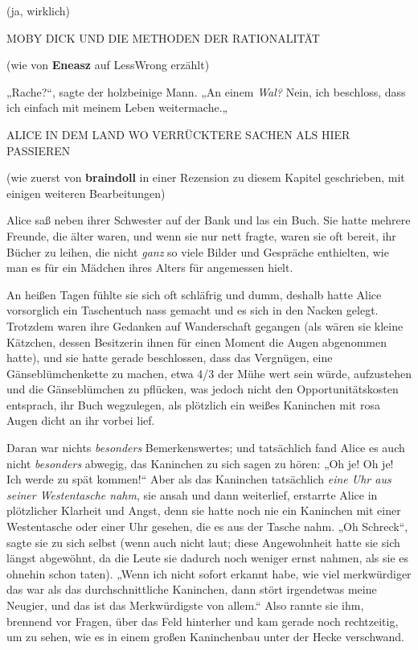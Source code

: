 {(ja, wirklich)

MOBY DICK UND DIE METHODEN DER RATIONALITÄT

(wie von \textbf{Eneasz} auf LessWrong erzählt)

„Rache?“, sagte der holzbeinige Mann. „An einem \emph{Wal?} Nein, ich beschloss, dass ich einfach mit meinem Leben weitermache.„

ALICE IN DEM LAND WO VERRÜCKTERE SACHEN ALS HIER PASSIEREN

(wie zuerst von \textbf{braindoll} in einer Rezension zu diesem Kapitel geschrieben, mit einigen weiteren Bearbeitungen)

Alice saß neben ihrer Schwester auf der Bank und las ein Buch. Sie hatte mehrere Freunde, die älter waren, und wenn sie nur nett fragte, waren sie oft bereit, ihr Bücher zu leihen, die nicht \emph{ganz} so viele Bilder und Gespräche enthielten, wie man es für ein Mädchen ihres Alters für angemessen hielt.

An heißen Tagen fühlte sie sich oft schläfrig und dumm, deshalb hatte Alice vorsorglich ein Taschentuch nass gemacht und es sich in den Nacken gelegt. Trotzdem waren ihre Gedanken auf Wanderschaft gegangen (als wären sie kleine Kätzchen, dessen Besitzerin ihnen für einen Moment die Augen abgenommen hatte), und sie hatte gerade beschlossen, dass das Vergnügen, eine Gänseblümchenkette zu machen, etwa 4/3 der Mühe wert sein würde, aufzustehen und die Gänseblümchen zu pflücken, was jedoch nicht den Opportunitätskosten entsprach, ihr Buch wegzulegen, als plötzlich ein weißes Kaninchen mit rosa Augen dicht an ihr vorbei lief.

Daran war nichts \emph{besonders} Bemerkenswertes; und tatsächlich fand Alice es auch nicht \emph{besonders} abwegig, das Kaninchen zu sich sagen zu hören: „Oh je! Oh je! Ich werde zu spät kommen!“ Aber als das Kaninchen tatsächlich \emph{eine Uhr aus seiner Westentasche nahm}, sie ansah und dann weiterlief, erstarrte Alice in plötzlicher Klarheit und Angst, denn sie hatte noch nie ein Kaninchen mit einer Westentasche oder einer Uhr gesehen, die es aus der Tasche nahm. „Oh Schreck“, sagte sie zu sich selbst (wenn auch nicht laut; diese Angewohnheit hatte sie sich längst abgewöhnt, da die Leute sie dadurch noch weniger ernst nahmen, als sie es ohnehin schon taten). „Wenn ich nicht sofort erkannt habe, wie viel merkwürdiger das war als das durchschnittliche Kaninchen, dann stört irgendetwas meine Neugier, und das ist das Merkwürdigste von allem.“ Also rannte sie ihm, brennend vor Fragen, über das Feld hinterher und kam gerade noch rechtzeitig, um zu sehen, wie es in einem großen Kaninchenbau unter der Hecke verschwand.

}
